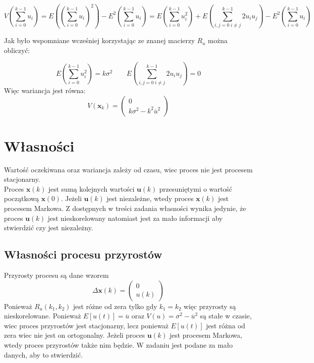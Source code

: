 \documentclass[10pt,a4paper]{article}
\begin{document}
\begin{equation}
V \left(\sum \limits_{i=0}^{k-1} u_i \right) = 
E \left( \left( \sum \limits_{i=0}^{k-1} u_i \right)^2 \right) - E^2 \left( \sum \limits_{i=0}^{k-1} u_i \right) =
E \left( \sum \limits_{i=0}^{k-1} u _i ^2  \right) + E \left( \sum \limits_{i,j=0 \; i \neq j} ^{k-1} 2u_i u_j \right) - E^2 \left( \sum \limits_{i=0}^{k-1} u_i \right)
\end{equation}

Jak było wspomniane wcześniej korzystając ze znanej macierzy $R_u$ można obliczyć:

\begin{equation}
E \left( \sum \limits_{i=0}^{k-1} u_i^2  \right) = k \sigma ^2 \qquad E \left( \sum \limits_{i,j=0 \; i \neq j}^{k-1} 2u_i u_j \right) = 0 
\end{equation}
Więc wariancja jest równa:
\begin{equation}
	V \left( \textbf{x}_k \right) = 
	\left(
	\begin{matrix}
	0 \\ 
	k\sigma^2 - k^2 \overline{u}^2	
	\end{matrix}
\right)
\end{equation}
\section*{Własności}
Wartość oczekiwana oraz wariancja zależy od czasu, wiec proces nie jest procesem stacjonarny. \\
Proces $\textbf{x}(k)$ jest sumą kolejnych wartości $\textbf{u}(k)$ przesuniętymi o wartość początkową $\textbf{x}(0)$. Jeżeli $\textbf{u}(k)$ jest niezależne, wtedy proces $\textbf{x}(k)$ jest procesem Markowa. Z dostępnych w treści zadania własności wynika jedynie, że proces $\textbf{u}(k)$ jest nieskorelowany natomiast jest za mało informacji aby stwierdzić czy jest niezależny.
\subsection*{Własności procesu przyrostów}
Przyrosty procesu są dane wzorem
\begin{equation}
	\Delta \textbf{x}(k) = \left( \begin{matrix}
		0 \\ u(k)
	\end{matrix} \right)
\end{equation}
Ponieważ $R_u(k_1, k_2)$ jest różne od zera tylko gdy $k_1 = k_2$ więc przyrosty są nieskorelowane. Ponieważ $E[u(t)]=\overline{u}$ oraz $V(u) = \sigma^2-\overline{u}^2$ są stałe w czasie, wiec proces przyrostów jest stacjonarny, lecz ponieważ $E[u(t)]$ jest różna od zera wiec nie jest on ortogonalny. Jeżeli proces $\textbf{u}(k)$ jest procesem Markowa, wtedy proces przyrostów także nim będzie. W zadaniu jest podane za mało danych, aby to stwierdzić.
\end{document}
